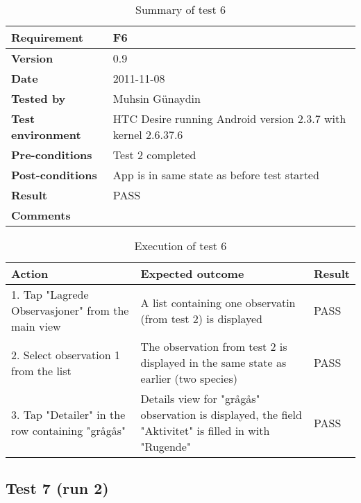 	\begin{table}[htb]
		\centering
		\begin{tabular}{|p{3.5cm}|p{7.0cm}|} \hline
			\textbf{Requirement} & F6 \\ \hline
			\textbf{Version} & 0.9 \\ \hline
			\textbf{Date} & 2011-11-08 \\ \hline
			\textbf{Tested by} & Muhsin Günaydin \\ \hline
			\textbf{Test environment} & HTC Desire running Android version 2.3.7 with kernel 2.6.37.6 \\ \hline
			\textbf{Pre-conditions} & Test 2 completed \\ \hline
			\textbf{Post-conditions} & App is in same state as before test started \\ \hline
			\textbf{Result} & PASS \\ \hline
			\textbf{Comments} & \\ \hline
		\end{tabular}
		\caption{Summary of test 6}
	\end{table}

	\begin{table}[htb]
		\centering
		\begin{tabular}{|p{5.0cm}|p{5.0cm}|p{1cm}|}
			\hline \textbf{Action} & \textbf{Expected outcome} & \textbf{Result} \\ \hline
				1. Tap "Lagrede Observasjoner" from the main view &
				A list containing one observatin (from test 2) is displayed &
				PASS \\ \hline

				2. Select observation 1 from the list &
				The observation from test 2 is displayed in the same state as
				earlier (two species) &
				PASS \\ \hline

				3. Tap "Detailer" in the row containing "grågås" &
				Details view for "grågås" observation is displayed, the field "Aktivitet"
				is filled in with "Rugende" &
				PASS \\ \hline
		\end{tabular}
		\caption{Execution of test 6}
	\end{table}

\newpage
\subsection*{Test 7 (run 2)}

